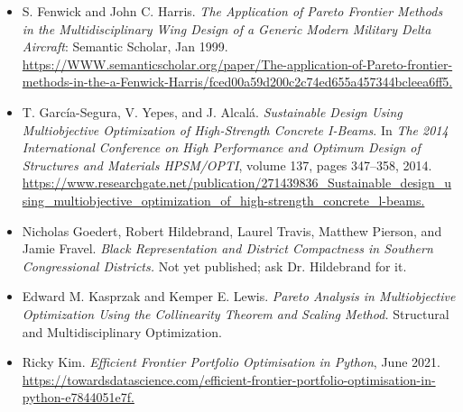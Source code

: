 \begin{itemize}
    \item[\textbf{[1]}] S. Fenwick and John C. Harris. \emph{The Application of Pareto Frontier Methods in the Multidisciplinary Wing Design of a Generic Modern Military Delta Aircraft}: Semantic Scholar, Jan 1999.  
    \\
    \url{https://WWW.semanticscholar.org/paper/The-application-of-Pareto-frontier-methods-in-the-a-Fenwick-Harris/fced00a59d200c2c74ed655a457344bcleea6ff5.}

    \item[\textbf{[2]}] T. Garc\'ia-Segura, V. Yepes, and J. Alcal\'a. \emph{Sustainable Design Using Multiobjective Optimization of High-Strength Concrete I-Beams}. In \emph{The 2014 International Conference on High Performance and Optimum Design of Structures and Materials HPSM/OPTI}, volume 137, pages 347--358, 2014.  
    \\
    \url{https://www.researchgate.net/publication/271439836_Sustainable_design_using_multiobjective_optimization_of_high-strength_concrete_l-beams.}

    \item[\textbf{[3]}] Nicholas Goedert, Robert Hildebrand, Laurel Travis, Matthew Pierson, and Jamie Fravel. \emph{Black Representation and District Compactness in Southern Congressional Districts.} Not yet published; ask Dr. Hildebrand for it.

    \item[\textbf{[4]}] Edward M. Kasprzak and Kemper E. Lewis. \emph{Pareto Analysis in Multiobjective Optimization Using the Collinearity Theorem and Scaling Method.} Structural and Multidisciplinary Optimization.

    \item[\textbf{[5]}] Ricky Kim. \emph{Efficient Frontier Portfolio Optimisation in Python}, June 2021.  
    \\
    \url{https://towardsdatascience.com/efficient-frontier-portfolio-optimisation-in-python-e7844051e7f.}
\end{itemize}
